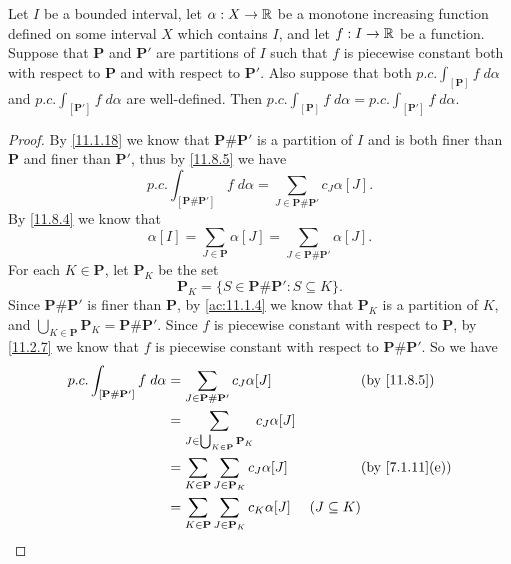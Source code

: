 \begin{ac}\label{ac:11.8.4}
  Let \(I\) be a bounded interval, let \(\alpha : X \to \mathbb{R}\) be a monotone increasing function defined on some interval \(X\) which contains \(I\), and let \(f : I \to \mathbb{R}\) be a function.
  Suppose that \(\mathbf{P}\) and \(\mathbf{P}'\) are partitions of \(I\) such that \(f\) is piecewise constant both with respect to \(\mathbf{P}\) and with respect to \(\mathbf{P}'\).
  Also suppose that both \(p.c. \int_{[\mathbf{P}]} f \; d \alpha\) and \(p.c. \int_{[\mathbf{P}']} f \; d \alpha\) are well-defined.
  Then \(p.c. \int_{[\mathbf{P}]} f \; d \alpha = p.c. \int_{[\mathbf{P}']} f \; d \alpha\).
\end{ac}

\begin{proof}
  By \cref{11.1.18} we know that \(\mathbf{P} \# \mathbf{P}'\) is a partition of \(I\) and is both finer than \(\mathbf{P}\) and finer than \(\mathbf{P}'\), thus by \cref{11.8.5} we have
  \[
    p.c. \int_{[\mathbf{P} \# \mathbf{P}']} f \; d \alpha = \sum_{J \in \mathbf{P} \# \mathbf{P}'} c_J \alpha[J].
  \]
  By \cref{11.8.4} we know that
  \[
    \alpha[I] = \sum_{J \in \mathbf{P}} \alpha[J] = \sum_{J \in \mathbf{P} \# \mathbf{P}'} \alpha[J].
  \]
  For each \(K \in \mathbf{P}\), let \(\mathbf{P}_K\) be the set
  \[
    \mathbf{P}_K = \{S \in \mathbf{P} \# \mathbf{P}' : S \subseteq K\}.
  \]
  Since \(\mathbf{P} \# \mathbf{P}'\) is finer than \(\mathbf{P}\), by \cref{ac:11.1.4} we know that \(\mathbf{P}_K\) is a partition of \(K\), and \(\bigcup_{K \in \mathbf{P}} \mathbf{P}_K = \mathbf{P} \# \mathbf{P}'\).
  Since \(f\) is piecewise constant with respect to \(\mathbf{P}\), by \cref{11.2.7} we know that \(f\) is piecewise constant with respect to \(\mathbf{P} \# \mathbf{P}'\).
  So we have
  \begin{align*}
    p.c. \int_{[\mathbf{P} \# \mathbf{P}']} f \; d \alpha & = \sum_{J \in \mathbf{P} \# \mathbf{P}'} c_J \alpha[J]                        &                 & \text{(by \cref{11.8.5})}    \\
                                                          & = \sum_{J \in \bigcup_{K \in \mathbf{P}} \mathbf{P}_K} c_J \alpha[J]                                                           \\
                                                          & = \sum_{K \in \mathbf{P}} \sum_{J \in \mathbf{P}_K} c_J \alpha[J]             &                 & \text{(by \cref{7.1.11}(e))} \\
                                                          & = \sum_{K \in \mathbf{P}} \sum_{J \in \mathbf{P}_K} c_K \alpha[J]             & (J \subseteq K)                                \\

\end{align*}
\end{proof}
